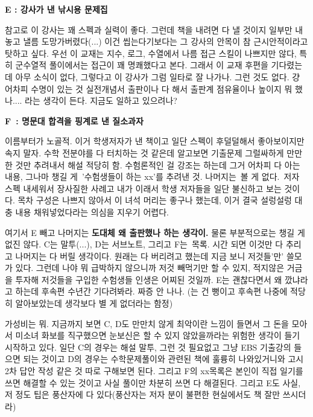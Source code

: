 \textbf{E : 강사가 낸 낚시용 문제집}
\vspace{5mm}

참고로 이 강사는 꽤 스펙과 실력이 좋다. 그런데 책을 내려면 다 낼 것이지 일부만 내놓고 낼름 도망가버렸다(...)
이건 씹는다기보다는 그 강사의 안목이 참 근시안적이라고 탓하고 싶다.
우선 이 교재는 지수, 로그, 수열에서 나름 접근 스킬이 나쁘지만 않다, 특히 군수열적 풀이에서는 접근이 꽤 명쾌했다고 본다.
그래서 이 교재 후편을 기다렸는데 아무 소식이 없다, 그렇다고 이 강사가 그럼 일타로 잘 나가나. 그런 것도 없다.
걍 어차피 수명이 있는 것 실전개념서 출판이나 다 해서 출판계 점유율이나 높이지 뭐 했나.... 라는 생각이 든다. 지금도 일하고 있으려나?
\vspace{5mm}

\textbf{F : 명문대 합격을 핑계로 낸 질소과자}
\vspace{5mm}

이름부터가 노골적. 이거 학생저자가 낸 책이고 일단 스펙이 후덜덜해서 좋아보이지만 속지 말자.
수학 전분야를 다 터치하는 것 같은데 알고보면 기출문제 그럴싸하게 만만한 것만 추려내서 해설 적당히 함.
수험론적인 걸 강조는 하는데 그거 어차피 다 아는 내용, 그나마 챙길 게 '수험생들이 하는 xx'를 추려낸 것.
나머지는 볼 게 없다. 저자 스펙 내세워서 장사질한 사례고 내가 이래서 학생 저자들을 일단 불신하고 보는 것이다.
목차 구성은 나쁘지 않아서 이 녀석 머리는 좋구나 했는데, 이거 결국 설렁설렁 대충 내용 채워넣었다라는 의심을 지우기 어렵다.
\vspace{5mm}

여기서 E 빼고 나머지는 \textbf{도대체 왜 출판했나 하는 생각이.}
물론 부분적으로는 챙길 게 없진 않다.
C는 말투(...), D는 서브노트, 그리고 F는 목록. 시간 되면 이것만 다 추리고 나머지는 다 버릴 생각이다.
원래는 다 버리려고 했는데 지금 보니 저것들'만' 쓸모가 있다.
그런데 나야 뭐 급박하지 않으니까 저것 빼먹기만 할 수 있지, 적지않은 거금을 투자해 저것들을 구입한 수험생들 인생은 어찌된 것일까.
E는 괜찮다면서 왜 깠냐라고 하는데 후속편 수년간 기다려봐라. 짜증 안 나나.
(는 건 뻥이고 후속편 나중에 적당히 알아보았는데 생각보다 별 게 없더라는 함정)
\vspace{5mm}

가성비는 뭐. 지금까지 보면 C, D도 만만치 않게 최악이란 느낌이 들면서
그 돈을 모아서 미소녀 화보를 직구했으면 눈보신은 할 수 있지 않았을까라는 위험한 생각이 들기 시작하고 있다.
일단 C의 경우는 해설 말투, 그런 것 필요없고 그냥 EBS 기출강의 들으면 되는 것이고
D의 경우는 수학문제풀이와 관련된 책에 훌륭히 나와있거니와 고시 2차 답안 작성 같은 것 따로 구해보면 된다.
그리고 F의 xx목록은 본인이 직접 일기를 쓰면 해결할 수 있는 것이고 사실 풀이만 차분히 쓰면 다 해결된다.
그리고 E도 사실, 저 정도 팁은 풍산자에 다 있다(풍산자는 저자 분이 불편한 현실에서도 책 잘만 쓰시더라)
\vspace{5mm}

